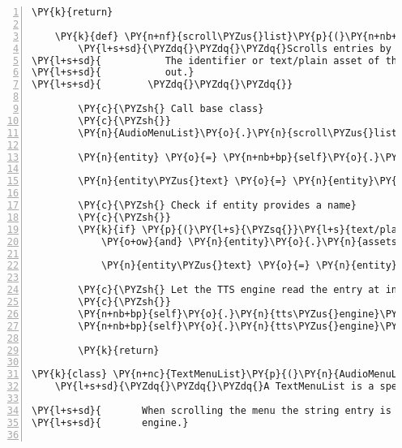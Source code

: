 \begin{Verbatim}[commandchars=\\\{\},numbers=left,firstnumber=1,stepnumber=1]
        \PY{k}{return}

    \PY{k}{def} \PY{n+nf}{scroll\PYZus{}list}\PY{p}{(}\PY{n+nb+bp}{self}\PY{p}{,} \PY{n}{key}\PY{p}{)}\PY{p}{:}
        \PY{l+s+sd}{\PYZdq{}\PYZdq{}\PYZdq{}Scrolls entries by decreasing or increasing the list\PYZus{}index and reads out the currently selected Entity.}
\PY{l+s+sd}{           The identifier or text/plain asset of the selected Entity is read}
\PY{l+s+sd}{           out.}
\PY{l+s+sd}{        \PYZdq{}\PYZdq{}\PYZdq{}}

        \PY{c}{\PYZsh{} Call base class}
        \PY{c}{\PYZsh{}}
        \PY{n}{AudioMenuList}\PY{o}{.}\PY{n}{scroll\PYZus{}list}\PY{p}{(}\PY{n+nb+bp}{self}\PY{p}{,} \PY{n}{key}\PY{p}{)}

        \PY{n}{entity} \PY{o}{=} \PY{n+nb+bp}{self}\PY{o}{.}\PY{n}{list}\PY{p}{[}\PY{n+nb+bp}{self}\PY{o}{.}\PY{n}{list\PYZus{}index}\PY{p}{]}\PY{p}{[}\PY{l+m+mi}{0}\PY{p}{]}

        \PY{n}{entity\PYZus{}text} \PY{o}{=} \PY{n}{entity}\PY{o}{.}\PY{n}{identifier}

        \PY{c}{\PYZsh{} Check if entity provides a name}
        \PY{c}{\PYZsh{}}
        \PY{k}{if} \PY{p}{(}\PY{l+s}{\PYZsq{}}\PY{l+s}{text/plain}\PY{l+s}{\PYZsq{}} \PY{o+ow}{in} \PY{n}{entity}\PY{o}{.}\PY{n}{assets}\PY{o}{.}\PY{n}{keys}\PY{p}{(}\PY{p}{)}
            \PY{o+ow}{and} \PY{n}{entity}\PY{o}{.}\PY{n}{assets}\PY{p}{[}\PY{l+s}{\PYZsq{}}\PY{l+s}{text/plain}\PY{l+s}{\PYZsq{}}\PY{p}{]}\PY{o}{.}\PY{n}{data} \PY{o+ow}{is} \PY{o+ow}{not} \PY{n+nb+bp}{None}\PY{p}{)}\PY{p}{:}

            \PY{n}{entity\PYZus{}text} \PY{o}{=} \PY{n}{entity}\PY{o}{.}\PY{n}{assets}\PY{p}{[}\PY{l+s}{\PYZsq{}}\PY{l+s}{text/plain}\PY{l+s}{\PYZsq{}}\PY{p}{]}\PY{o}{.}\PY{n}{data}\PY{p}{[}\PY{l+m+mi}{0}\PY{p}{]}

        \PY{c}{\PYZsh{} Let the TTS engine read the entry at index}
        \PY{c}{\PYZsh{}}
        \PY{n+nb+bp}{self}\PY{o}{.}\PY{n}{tts\PYZus{}engine}\PY{o}{.}\PY{n}{say}\PY{p}{(}\PY{n}{entity\PYZus{}text}\PY{p}{)}
        \PY{n+nb+bp}{self}\PY{o}{.}\PY{n}{tts\PYZus{}engine}\PY{o}{.}\PY{n}{runAndWait}\PY{p}{(}\PY{p}{)}

        \PY{k}{return}

\PY{k}{class} \PY{n+nc}{TextMenuList}\PY{p}{(}\PY{n}{AudioMenuList}\PY{p}{)}\PY{p}{:}
    \PY{l+s+sd}{\PYZdq{}\PYZdq{}\PYZdq{}A TextMenuList is a specific AudioMenuList whose list is supposed to contain strings.}

\PY{l+s+sd}{       When scrolling the menu the string entry is read out by a text\PYZhy{}to\PYZhy{}speech}
\PY{l+s+sd}{       engine.}


\end{Verbatim}
